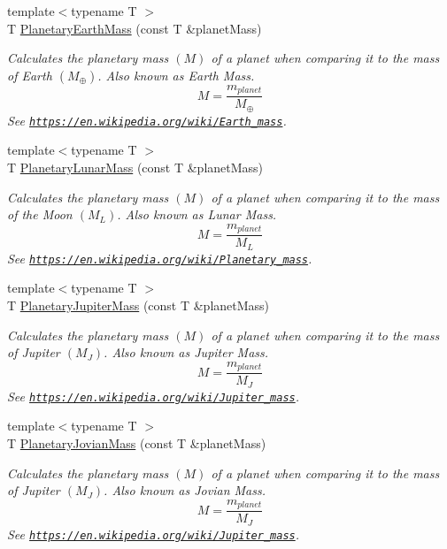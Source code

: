 \begin{DoxyCompactItemize}
{\footnotesize template$<$typename T $>$ }\\T \mbox{\hyperlink{group___e_g_x_phys-_planetary_mass_ga3d918c2d37a72b42b49aa6c3da08f450}{Planetary\+Earth\+Mass}} (const T \&planet\+Mass)
\begin{DoxyCompactList}\small\item\em Calculates the planetary mass $(M)$ of a planet when comparing it to the mass of Earth $(M_\oplus)$. Also known as Earth Mass. \[M=\frac{m_{planet}}{M_\oplus}\] See \href{https://en.wikipedia.org/wiki/Earth_mass}{\tt https\+://en.\+wikipedia.\+org/wiki/\+Earth\+\_\+mass}. \end{DoxyCompactList}\item 
{\footnotesize template$<$typename T $>$ }\\T \mbox{\hyperlink{group___e_g_x_phys-_planetary_mass_gaaea9675ef409d141d269d970f2f5e9dd}{Planetary\+Lunar\+Mass}} (const T \&planet\+Mass)
\begin{DoxyCompactList}\small\item\em Calculates the planetary mass $(M)$ of a planet when comparing it to the mass of the Moon $(M_L)$. Also known as Lunar Mass. \[M=\frac{m_{planet}}{M_L}\] See \href{https://en.wikipedia.org/wiki/Planetary_mass}{\tt https\+://en.\+wikipedia.\+org/wiki/\+Planetary\+\_\+mass}. \end{DoxyCompactList}\item 
{\footnotesize template$<$typename T $>$ }\\T \mbox{\hyperlink{group___e_g_x_phys-_planetary_mass_gaadff5ffa04bb55a572c1403ab9500c06}{Planetary\+Jupiter\+Mass}} (const T \&planet\+Mass)
\begin{DoxyCompactList}\small\item\em Calculates the planetary mass $(M)$ of a planet when comparing it to the mass of Jupiter $(M_J)$. Also known as Jupiter Mass. \[M=\frac{m_{planet}}{M_J}\] See \href{https://en.wikipedia.org/wiki/Jupiter_mass}{\tt https\+://en.\+wikipedia.\+org/wiki/\+Jupiter\+\_\+mass}. \end{DoxyCompactList}\item 
{\footnotesize template$<$typename T $>$ }\\T \mbox{\hyperlink{group___e_g_x_phys-_planetary_mass_ga4663e9388a3bd1a20f94beb52021f293}{Planetary\+Jovian\+Mass}} (const T \&planet\+Mass)
\begin{DoxyCompactList}\small\item\em Calculates the planetary mass $(M)$ of a planet when comparing it to the mass of Jupiter $(M_J)$. Also known as Jovian Mass. \[M=\frac{m_{planet}}{M_J}\] See \href{https://en.wikipedia.org/wiki/Jupiter_mass}{\tt https\+://en.\+wikipedia.\+org/wiki/\+Jupiter\+\_\+mass}. \end{DoxyCompactList}\item 

\end{DoxyCompactItemize}
